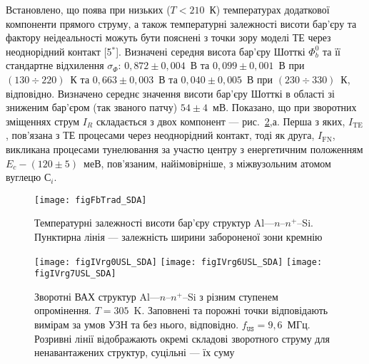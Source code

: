 Встановлено, що поява при низьких ($T<210$~К) температурах додаткової компоненти прямого струму,
а також температурні залежності висоти бар'єру та фактору неідеальності можуть бути пояснені
з точки зору моделі ТЕ через неоднорідний контакт
[5$^*$].
%
       Визначені середня висота бар'єру Шотткі $\Phi_b^0$ та її стандартне відхилення $\sigma_{\Phi}$:
       $0,872\pm0,004$~В та $0,099\pm0,001$~В при $(130\div220)$~К та
       $0,663\pm0,003$~В та $0,040\pm0,005$~В при $(230\div330)$~К, відповідно.
Визначено середнє значення висоти бар'єру Шотткі в області зі зниженим бар'єром (так званого патчу) $54\pm4$~мВ.
Показано, що при зворотних зміщеннях струм $I_R$ складається з двох компонент --- рис.~\ref{figIVrg0USL_SDA},а.
Перша з яких, $I_\mathrm{TE}$, пов'язана з ТЕ процесами через неоднорідний контакт,
тоді як друга,
$I_\mathrm{FN}$, викликана процесами тунелювання за участю
центру з енергетичним положенням $E_c-(120\pm5)$~меВ, пов'язаним, найімовірніше, з міжвузольним атомом вуглецю С$_i$.

\begin{figure}
\center
\texttt{[image: figFbTrad\_SDA]}
\caption{\label{figFbTrad_SDA}
Температурні залежності висоти бар'єру структур Al---$n$--$n^+$--Si.
Пунктирна лінія --- залежність ширини забороненої зони кремнію
}%
\end{figure}



\begin{figure}[b]
\center
\texttt{[image: figIVrg0USL\_SDA]}\hfill
\texttt{[image: figIVrg6USL\_SDA]}\hfill
\texttt{[image: figIVrg7USL\_SDA]}
\caption{\label{figIVrg0USL_SDA}
Зворотні  ВАХ  структур Al---$n$--$n^+$--Si з різним ступенем опромінення.
$T=305$~K.
Заповнені та порожні точки відповідають вимірам за умов УЗН та без нього, відповідно.
$f_\mathtt{US}=9,6$~МГц.
Розривні лінії відображають окремі складові зворотного струму для ненавантажених структур,
суцільні --- їх суму
}%
\end{figure}

